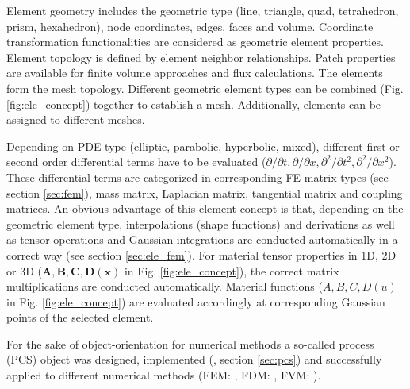 Element geometry includes the geometric type (line, triangle, quad, 
tetrahedron, prism, hexahedron), node coordinates, edges, faces and 
volume. Coordinate transformation functionalities are considered as 
geometric element properties. Element topology is defined by element 
neighbor relationships. Patch properties are available for finite 
volume approaches and flux calculations. The elements form the mesh 
topology. Different geometric element types can be combined (Fig. 
\ref{fig:ele_concept}) together to establish a mesh. Additionally, 
elements can be assigned to different meshes.

Depending on PDE type (elliptic, parabolic, hyperbolic, mixed),
different first or second order differential terms have to be
evaluated ($\partial/\partial t, \partial/\partial x,
\partial^2/\partial t^2, \partial^2/\partial x^2$). These differential
terms are categorized in corresponding FE matrix types (see section 
\ref{sec:fem}), mass matrix, Laplacian matrix, tangential matrix and 
coupling matrices. An obvious advantage of this element concept is 
that, depending on the geometric element type, interpolations (shape 
functions) and derivations as well as tensor operations and Gaussian 
integrations are conducted automatically in a correct way (see 
section \ref{sec:ele_fem}). For material tensor properties in 1D, 2D 
or 3D ($\mathbf{A,B,C,D(x)}$ in Fig. \ref{fig:ele_concept}), the 
correct matrix multiplications are conducted automatically. Material 
functions ($A,B,C,D(u)$ in Fig. \ref{fig:ele_concept}) are evaluated 
accordingly at corresponding Gaussian points of the selected 
element.

For the sake of object-orientation for numerical methods a so-called 
process (PCS) object was designed, implemented (\cite{KolBau:04}, 
section \ref{sec:pcs}) and successfully applied to different 
numerical methods (FEM: \cite{KolEtAl:2004a}, FDM: 
\cite{KolEtAl:2005a}, FVM: \cite{Bei:2005}).
